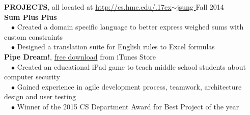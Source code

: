 \documentclass[11pt]{article}
\newcommand{\tildeText}{\raise.17ex\hbox{$\scriptstyle\sim$}}
\newcommand{\websitedisplaytext}{\small http://cs.hmc.edu/\tildeText jsung }
\newcommand{\website}{\href{http://cs.hmc.edu/~jsung}{\websitedisplaytext}}
\newcommand{\sectionNL}{\\[-2pt]}
\newcommand{\customtab}{$\hspace{10pt} \bullet \hspace{2pt}$}
\newcommand{\JudgeNudge}{\hspace{4pt}}
\newcommand{\rightAlign}{\hfill}
\begin{document}
\begin{flushleft}
{\textbf{PROJECTS}, all located at \website} \rightAlign Fall 2014 \sectionNL 
\textbf{Sum Plus Plus} \\
\customtab Created a domain specific language to better express weighed sums with custom constraints \\
\customtab Designed a translation suite for English rules to Excel formulas \\

\textbf{Pipe Dream!}, \href{https://itunes.apple.com/us/app/pipe-dream!/id947630499?mt=8}{free download} from iTunes Store \\
\customtab Created an educational iPad game to teach middle school students about computer security\\
\customtab Gained experience in agile development process, teamwork, architecture design and user testing \\
\customtab Winner of the 2015 CS Department Award for Best Project of the year 

 


\end{flushleft}
\end{document}

